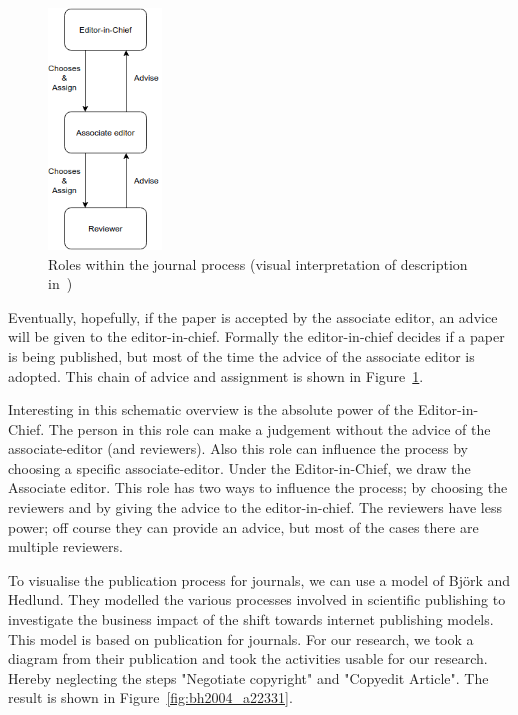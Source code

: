 \documentclass{ou-report}
\newcommand{\outline}[1]{{\color{blue} #1}}
\begin{document}
\begin{figure}
    \centering
    \includegraphics[width=0.27\textwidth]{images/c2013.drawio.png}
    \caption{Roles within the journal process (visual interpretation of description in~\cite{C2013})}
    \label{fig:c2013}
\end{figure}

Eventually, hopefully, if the paper is accepted by the associate editor, an 
advice will be given to the editor-in-chief. Formally the editor-in-chief 
decides if a paper is being published, but most of the time the advice of the 
associate editor is adopted. This chain of advice and assignment is shown in 
Figure~\ref{fig:c2013}. 

Interesting in this schematic overview is the absolute 
power of the Editor-in-Chief. The person in this role can make a judgement 
without the advice of the 
associate-editor (and reviewers). Also this role can influence the process by 
choosing a specific associate-editor. Under the Editor-in-Chief, we draw the 
Associate editor. This role has two ways to influence the process; by choosing 
the reviewers and by giving the advice to the editor-in-chief. The reviewers 
have less power; off course they can provide an advice, but most of the cases 
there are multiple reviewers.


To visualise the publication process for journals, we can use a model of 
Bj\"ork and Hedlund. They modelled the various processes involved in scientific
publishing to investigate the business impact of the shift towards internet
publishing models. This model is based on publication for journals.
For our research, we took a diagram from their publication and took the 
activities usable for our research. Hereby neglecting the steps 
"Negotiate copyright" and "Copyedit Article". The result is shown in 
Figure~\ref{fig:bh2004_a22331}.
\end{document}
